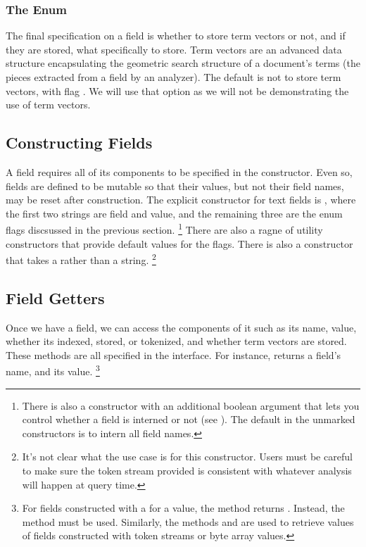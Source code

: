 \subsubsection{The  Enum}

The final specification on a field is whether to store term vectors or
not, and if they are stored, what specifically to store.  Term vectors
are an advanced data structure encapsulating the geometric search
structure of a document's terms (the pieces extracted from a field by
an analyzer).  The default is not to store term vectors, with flag
.  We will use that option as we will not be
demonstrating the use of term vectors.


\subsection{Constructing Fields}

A field requires all of its components to be specified in the
constructor.  Even so, fields are defined to be mutable so that their
values, but not their field names, may be reset after construction.
The explicit constructor for text fields is
,
where the first two strings are field and value, and the remaining
three are the enum flags discsussed in the previous section.%
%
\footnote{There is also a constructor with an additional boolean
  argument that lets you control whether a field is interned or not
  (see ).  The default in the unmarked
  constructors is to intern all field names.}
%
There are also a ragne of utility constructors that provide default
values for the flags.  There is also a constructor that takes a
 rather than a string.%
%
\footnote{It's not clear what the use case is for this constructor.
Users must be careful to make sure the token stream provided is
consistent with whatever analysis will happen at query time.}

\subsection{Field Getters}

Once we have a field, we can access the components of it such as its
name, value, whether its indexed, stored, or tokenized, and whether
term vectors are stored.  These methods are all specified in the
 interface.  For instance,  returns
a field's name, and  its value.%
%
\footnote{For fields constructed with a  for a value,
the method  returns .  Instead,
the method  must be used.  Similarly, the
methods  and  are
used to retrieve values of fields constructed with token streams
or byte array values.}
%

